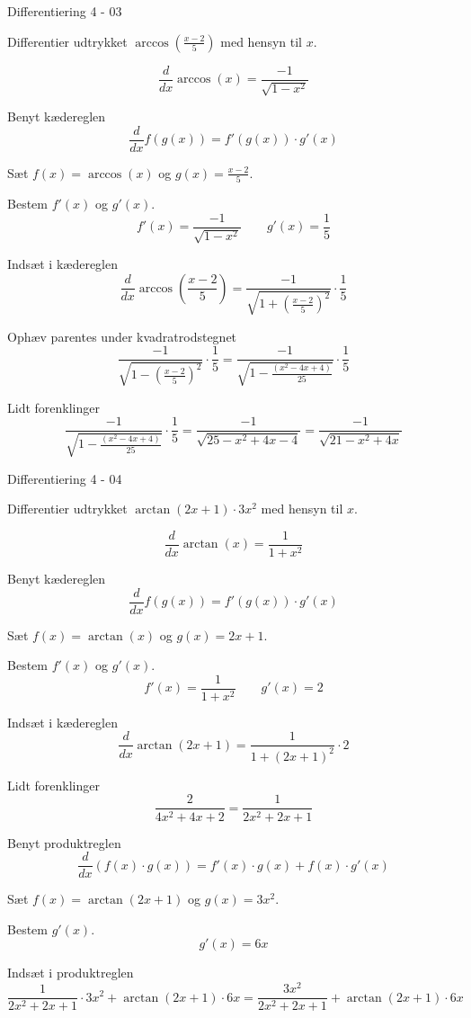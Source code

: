 \documentclass{article}
\begin{document}
\begin{exercise}{Differentiering 4 - 03}
	
	Differentier udtrykket $\arccos\left( \frac{x-2}{5} \right)$ med hensyn til $x$.
	
	
	\hint
	\[
	\frac{d}{dx} \arccos(x) = \frac{-1}{\sqrt{1 - x^2}}
	\]
	
	
	\hint
	Benyt kædereglen
	\[
	\frac{d}{dx} f(g(x)) = f'(g(x)) \cdot g'(x)
	\]
	
	\hint
	Sæt $f(x) = \arccos(x)$ og $g(x) = \frac{x-2}{5}$.
	
	\hint
	Bestem $f'(x)$ og $g'(x)$.
	\[
	f'(x) = \frac{-1}{\sqrt{1 - x^2}} \qquad g'(x) = \frac{1}{5}
	\]

	\hint
	Indsæt i kædereglen
	\[
	\frac{d}{dx} \arccos\left( \frac{x - 2}{5} \right) = \frac{-1}{\sqrt{1 + \left( \frac{x - 2}{5} \right)^2}} \cdot \frac{1}{5}
	\]
	
	\hint
	Ophæv parentes under kvadratrodstegnet
	\[
	\frac{-1}{\sqrt{1 - \left( \frac{x - 2}{5} \right)^2}} \cdot \frac{1}{5} = \frac{-1}{\sqrt{1 - \frac{(x^2 - 4x + 4)}{25}}} \cdot \frac{1}{5}
	\]
	
	\hint
	Lidt forenklinger
	\[
	\frac{-1}{\sqrt{1 - \frac{\left( x^2 - 4x + 4 \right)}{25}}} \cdot \frac{1}{5} = \frac{-1}{\sqrt{25 - x^2 + 4x - 4}} = \frac{-1}{\sqrt{21 - x^2 + 4x}} 
	\]
\end{exercise}

\begin{exercise}{Differentiering 4 - 04}

	Differentier udtrykket $\arctan\left( 2x + 1\right) \cdot 3x^2 $ med hensyn til $x$.
	
	
	\hint
	\[
	\frac{d}{dx} \arctan(x) = \frac{1}{1 + x^ 2}
	\]
	
	
	\hint
	Benyt kædereglen
	\[
	\frac{d}{dx} f(g(x)) = f'(g(x)) \cdot g'(x)
	\]
	
	\hint
	Sæt $f(x) = \arctan(x)$ og $g(x) = 2x + 1$.
	
	\hint
	Bestem $f'(x)$ og $g'(x)$.
	\[
	f'(x) = \frac{1}{1 + x^ 2} \qquad g'(x) = 2
	\]
	
	\hint
	Indsæt i kædereglen
	\[
	\frac{d}{dx} \arctan\left( 2x + 1 \right) = \frac{1}{1 + \left( 2x + 1 \right)^2} \cdot 2
	\]
	
	\hint
	Lidt forenklinger
	\[
	\frac{2}{4x^2 + 4x  + 2} = \frac{1}{2x^2 + 2x + 1}
	\]
	
	\hint
	Benyt produktreglen
	\[
	\frac{d}{dx} \left(f(x) \cdot g(x) \right) = f'(x) \cdot g(x) + f(x) \cdot g'(x)
	\]
	
	\hint
	Sæt $f(x) = \arctan(2x + 1)$ og $g(x) = 3x^2$.
	
	\hint
	Bestem $g'(x)$.
	\[
	g'(x) = 6x
	\]
	
	\hint
	Indsæt i produktreglen
	\[
	 \frac{1}{2x^2 + 2x + 1} \cdot 3x^2 + \arctan(2x + 1) \cdot 6x = \frac{3x^2}{2x^2 + 2x + 1} +  \arctan(2x + 1) \cdot 6x
	\]
	

\end{exercise}
\end{document}
